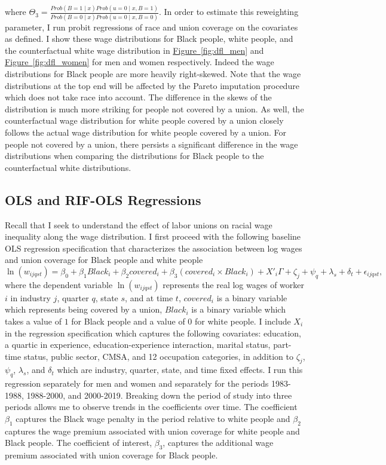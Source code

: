 \documentclass[11pt]{article}
\begin{document}
where $\Theta_3 = \frac{Prob(B = 1\mid x) Prob(u = 0\mid x, B = 1)}{Prob(B = 0\mid x)Prob(u = 0\mid x, B = 0)}$. In order to estimate this reweighting parameter, I run probit regressions of race and union coverage on the covariates as defined. I show these wage distributions for Black people, white people, and the counterfactual white wage distribution in \hyperref[fig:dfl_men]{Figure~\ref*{fig:dfl_men}} and \hyperref[fig:dfl_women]{Figure~\ref*{fig:dfl_women}} for men and women respectively. Indeed the wage distributions for Black people are more heavily right-skewed. Note that the wage distributions at the top end will be affected by the Pareto imputation procedure which does not take race into account. The difference in the skews of the distribution is much more striking for people not covered by a union. As well, the counterfactual wage distribution for white people covered by a union closely follows the actual wage distribution for white people covered by a union. For people not covered by a union, there persists a significant difference in the wage distributions when comparing the distributions for Black people to the counterfactual white distributions.   

\subsection{OLS and RIF-OLS Regressions}
Recall that I seek to understand the effect of labor unions on racial wage inequality along the wage distribution. I first proceed with the following baseline OLS regression specification that characterizes the association between log wages and union coverage for Black people and white people
\begin{equation}
    \ln(w_{ijqst}) = \beta_0 + \beta_1 Black_i + \beta_2 covered_i + \beta_3 (covered_i \times Black_i)+ X'_i\Gamma + \zeta_j + \psi_q + \lambda_s  + \delta_t + \epsilon_{ijqst},
\end{equation}
where the dependent variable $\ln(w_{ijqst})$ represents the real log wages of worker $i$ in industry $j$, quarter $q$, state $s$, and at time $t$, $covered_i$ is a binary variable which represents being covered by a union, $Black_i$ is a binary variable which takes a value of $1$ for Black people and a value of $0$ for white people. I include $X_i$ in the regression specification which captures the following covariates: education, a quartic in experience, education-experience interaction, marital status, part-time status, public sector, CMSA, and 12 occupation categories, in addition to $\zeta_j$, $\psi_q$, $\lambda_s$, and $\delta_t$ which are industry, quarter, state, and time fixed effects. I run this regression separately for men and women and separately for the periods 1983-1988, 1988-2000, and 2000-2019. Breaking down the period of study into three periods allows me to observe trends in the coefficients over time. The coefficient $\beta_1$ captures the Black wage penalty in the period relative to white people and $\beta_2$ captures the wage premium associated with union coverage for white people and Black people. The coefficient of interest, $\beta_3$, captures the additional wage premium associated with union coverage for Black people. 
\end{document}
